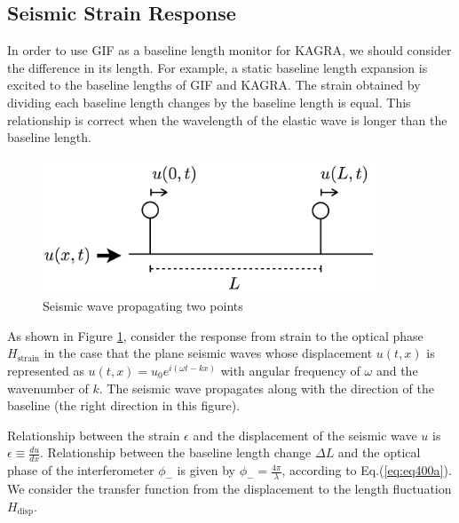 \newpage
\subsection{Seismic Strain Response}
In order to use GIF as a baseline length monitor for KAGRA, we should consider the difference in its length. For example, a static baseline length expansion is excited to the baseline lengths of GIF and KAGRA. The strain obtained by dividing each baseline length changes by the baseline length is equal. This relationship is correct when the wavelength of the elastic wave is longer than the baseline length.

\begin{figure}[h]
  \centering
  \includegraphics[width=10cm]{./img_chap4/img430.png}
  \caption{Seismic wave propagating two points} \label{img:img430}
\end{figure}

As shown in Figure \ref{img:img430}, consider the response from strain to the optical phase $H_{\mathrm{strain}}$ in the case that the plane seismic waves whose displacement $u(t,x)$ is represented as $u(t,x)=u_0e^{i(\omega{t}-kx)}$ with angular frequency of $\omega$ and the wavenumber of $k$. The seismic wave propagates along with the direction of the baseline (the right direction in this figure).


Relationship between the strain $\epsilon$ and the displacement of the seismic wave $u$ is $\epsilon\equiv{\frac{du}{dx}}$. Relationship between the baseline length change $\Delta{L}$ and the optical phase of the interferometer $\phi_{-}$ is given by $\phi_{-}=\frac{4\pi}{\lambda}$, according to Eq.(\ref{eq:eq400a}). We consider the transfer function from the displacement to the length fluctuation $H_{\mathrm{disp}}$.

